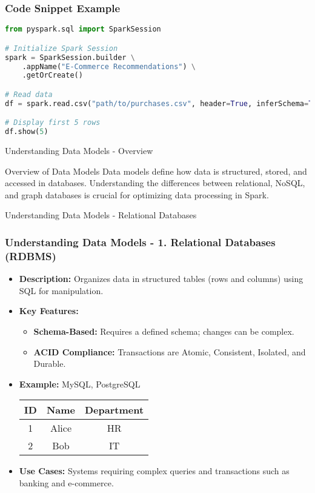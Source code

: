 \documentclass[aspectratio=169]{beamer}
\begin{document}
\begin{frame}[fragile]
    \frametitle{Code Snippet Example}
    \begin{lstlisting}[language=python]
from pyspark.sql import SparkSession

# Initialize Spark Session
spark = SparkSession.builder \
    .appName("E-Commerce Recommendations") \
    .getOrCreate()

# Read data
df = spark.read.csv("path/to/purchases.csv", header=True, inferSchema=True)

# Display first 5 rows
df.show(5)
\end{lstlisting}
\end{frame}

\begin{frame}[fragile]{Understanding Data Models - Overview}
    \begin{block}{Overview of Data Models}
        Data models define how data is structured, stored, and accessed in databases. Understanding the differences between relational, NoSQL, and graph databases is crucial for optimizing data processing in Spark.
    \end{block}
\end{frame}

\begin{frame}[fragile]{Understanding Data Models - Relational Databases}
    \frametitle{Understanding Data Models - 1. Relational Databases (RDBMS)}
    
    \begin{itemize}
        \item \textbf{Description:} Organizes data in structured tables (rows and columns) using SQL for manipulation.
        
        \item \textbf{Key Features:}
            \begin{itemize}
                \item \textbf{Schema-Based:} Requires a defined schema; changes can be complex.
                \item \textbf{ACID Compliance:} Transactions are Atomic, Consistent, Isolated, and Durable.
            \end{itemize}
        
        \item \textbf{Example:} MySQL, PostgreSQL
            \begin{center}
            \begin{tabular}{|c|c|c|}
                \hline
                ID & Name & Department \\
                \hline
                1 & Alice & HR \\
                2 & Bob & IT \\
                \hline
            \end{tabular}
            \end{center}

        \item \textbf{Use Cases:} Systems requiring complex queries and transactions such as banking and e-commerce.
    \end{itemize}
\end{frame}
\end{document}
